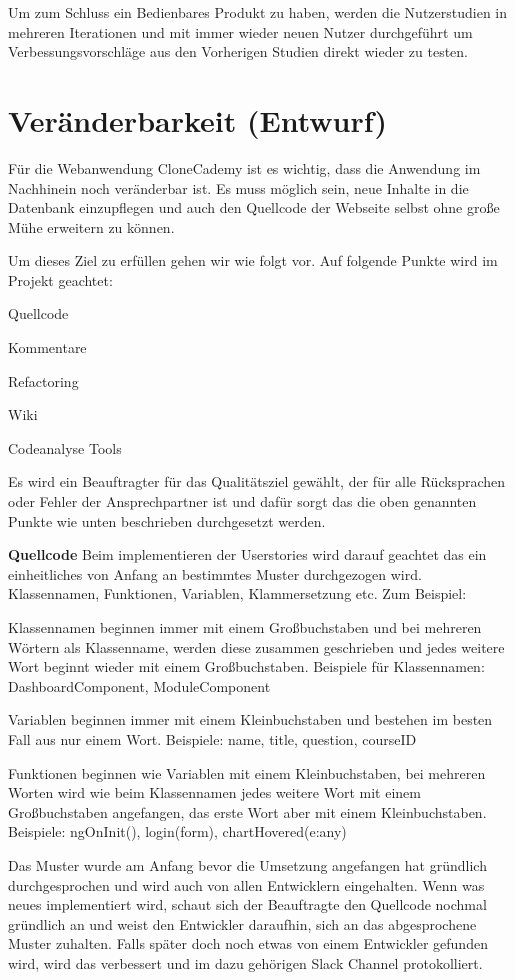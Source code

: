 \documentclass[accentcolor=tud0b,12pt,paper=a4]{tudreport}
\begin{document}
Um zum Schluss ein Bedienbares Produkt zu haben, werden die Nutzerstudien in mehreren Iterationen und mit immer wieder neuen Nutzer durchgeführt um Verbessungsvorschläge aus den Vorherigen Studien direkt wieder zu testen.

\section{Veränderbarkeit (Entwurf)}
Für die Webanwendung CloneCademy ist es wichtig, dass die Anwendung im Nachhinein noch veränderbar ist. Es muss möglich sein, neue Inhalte in die Datenbank einzupflegen und auch den Quellcode der Webseite selbst ohne große Mühe erweitern zu können.

Um dieses Ziel zu erfüllen gehen wir wie folgt vor. Auf folgende Punkte wird im Projekt geachtet:
\begin{description}
\item Quellcode
\item Kommentare
\item Refactoring
\item Wiki
\item Codeanalyse Tools
\end{description}

Es wird ein Beauftragter für das Qualitätsziel gewählt, der für alle Rücksprachen oder Fehler der Ansprechpartner ist und dafür sorgt das die oben genannten Punkte wie unten beschrieben durchgesetzt werden.

\textbf{Quellcode}
Beim implementieren der Userstories wird darauf geachtet das ein einheitliches von Anfang an bestimmtes Muster durchgezogen wird. Klassennamen, Funktionen, Variablen, Klammersetzung etc. Zum Beispiel:
\begin{description}
\item Klassennamen beginnen immer mit einem Großbuchstaben und bei mehreren Wörtern als Klassenname, werden diese zusammen geschrieben und jedes weitere Wort beginnt wieder mit einem Großbuchstaben. Beispiele für Klassennamen: DashboardComponent, ModuleComponent
\item Variablen beginnen immer mit einem Kleinbuchstaben und bestehen im besten Fall aus nur einem Wort. Beispiele: name, title, question, courseID
\item Funktionen beginnen wie Variablen mit einem Kleinbuchstaben, bei mehreren Worten wird wie beim Klassennamen jedes weitere Wort mit einem Großbuchstaben angefangen, das erste Wort aber mit einem Kleinbuchstaben. Beispiele: ngOnInit(), login(form), chartHovered(e:any)
\end{description}
Das Muster wurde am Anfang bevor die Umsetzung angefangen hat gründlich durchgesprochen und wird auch von allen Entwicklern eingehalten. Wenn was neues implementiert wird, schaut sich der Beauftragte den Quellcode nochmal gründlich an und weist den Entwickler daraufhin, sich an das abgesprochene Muster zuhalten. Falls später doch noch etwas von einem Entwickler gefunden wird,  wird das verbessert und im dazu gehörigen Slack Channel protokolliert.
\end{document}
